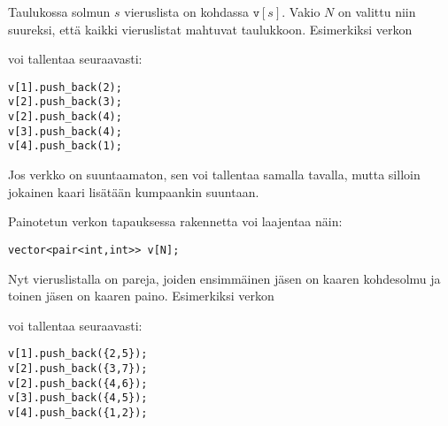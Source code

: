 Taulukossa solmun $s$ vieruslista on kohdassa $\texttt{v}[s]$.
Vakio $N$ on valittu niin suureksi,
että kaikki vieruslistat mahtuvat taulukkoon.
Esimerkiksi verkon

\begin{center}
\end{center}
voi tallentaa seuraavasti:
\begin{lstlisting}
v[1].push_back(2);
v[2].push_back(3);
v[2].push_back(4);
v[3].push_back(4);
v[4].push_back(1);
\end{lstlisting}

Jos verkko on suuntaamaton, sen voi tallentaa samalla tavalla,
mutta silloin jokainen kaari lisätään kumpaankin suuntaan.

Painotetun verkon tapauksessa rakennetta voi laajentaa näin:

\begin{lstlisting}
vector<pair<int,int>> v[N];
\end{lstlisting}

Nyt vieruslistalla on pareja, joiden ensimmäinen jäsen on
kaaren kohdesolmu ja toinen jäsen on kaaren paino.
Esimerkiksi verkon

\begin{center}
\end{center}
voi tallentaa seuraavasti:
\begin{lstlisting}
v[1].push_back({2,5});
v[2].push_back({3,7});
v[2].push_back({4,6});
v[3].push_back({4,5});
v[4].push_back({1,2});
\end{lstlisting}

